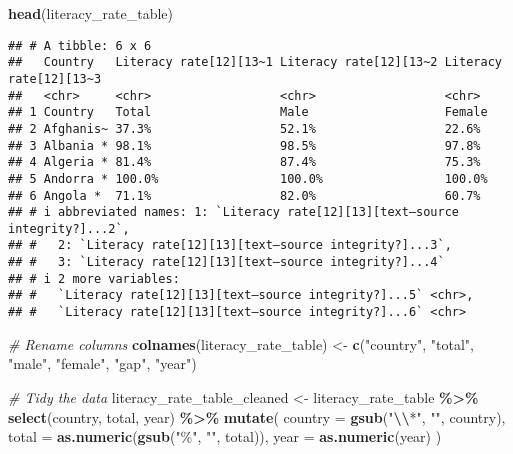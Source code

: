 \documentclass[
]{article}
\newenvironment{Shaded}{\begin{snugshade}}{\end{snugshade}}
\newcommand{\AttributeTok}[1]{\textcolor[rgb]{0.13,0.29,0.53}{#1}}
\newcommand{\CommentTok}[1]{\textcolor[rgb]{0.56,0.35,0.01}{\textit{#1}}}
\newcommand{\FunctionTok}[1]{\textcolor[rgb]{0.13,0.29,0.53}{\textbf{#1}}}
\newcommand{\NormalTok}[1]{#1}
\newcommand{\OtherTok}[1]{\textcolor[rgb]{0.56,0.35,0.01}{#1}}
\newcommand{\SpecialCharTok}[1]{\textcolor[rgb]{0.81,0.36,0.00}{\textbf{#1}}}
\newcommand{\StringTok}[1]{\textcolor[rgb]{0.31,0.60,0.02}{#1}}
\begin{document}
\begin{Shaded}
\begin{Highlighting}[]
\FunctionTok{head}\NormalTok{(literacy\_rate\_table)}
\end{Highlighting}
\end{Shaded}

\begin{verbatim}
## # A tibble: 6 x 6
##   Country   Literacy rate[12][13~1 Literacy rate[12][13~2 Literacy rate[12][13~3
##   <chr>     <chr>                  <chr>                  <chr>                 
## 1 Country   Total                  Male                   Female                
## 2 Afghanis~ 37.3%                  52.1%                  22.6%                 
## 3 Albania * 98.1%                  98.5%                  97.8%                 
## 4 Algeria * 81.4%                  87.4%                  75.3%                 
## 5 Andorra * 100.0%                 100.0%                 100.0%                
## 6 Angola *  71.1%                  82.0%                  60.7%                 
## # i abbreviated names: 1: `Literacy rate[12][13][text–source integrity?]...2`,
## #   2: `Literacy rate[12][13][text–source integrity?]...3`,
## #   3: `Literacy rate[12][13][text–source integrity?]...4`
## # i 2 more variables:
## #   `Literacy rate[12][13][text–source integrity?]...5` <chr>,
## #   `Literacy rate[12][13][text–source integrity?]...6` <chr>
\end{verbatim}

\begin{Shaded}
\begin{Highlighting}[]
\CommentTok{\# Rename columns}
\FunctionTok{colnames}\NormalTok{(literacy\_rate\_table) }\OtherTok{\textless{}{-}} \FunctionTok{c}\NormalTok{(}\StringTok{"country"}\NormalTok{, }\StringTok{"total"}\NormalTok{, }\StringTok{"male"}\NormalTok{, }\StringTok{"female"}\NormalTok{, }\StringTok{"gap"}\NormalTok{, }\StringTok{"year"}\NormalTok{)}

\CommentTok{\# Tidy the data}
\NormalTok{literacy\_rate\_table\_cleaned }\OtherTok{\textless{}{-}}\NormalTok{ literacy\_rate\_table }\SpecialCharTok{\%\textgreater{}\%}
  \FunctionTok{select}\NormalTok{(country, total, year) }\SpecialCharTok{\%\textgreater{}\%}
  \FunctionTok{mutate}\NormalTok{(}
    \AttributeTok{country =} \FunctionTok{gsub}\NormalTok{(}\StringTok{"}\SpecialCharTok{\textbackslash{}\textbackslash{}}\StringTok{*"}\NormalTok{, }\StringTok{""}\NormalTok{, country),  }
    \AttributeTok{total =} \FunctionTok{as.numeric}\NormalTok{(}\FunctionTok{gsub}\NormalTok{(}\StringTok{"\%"}\NormalTok{, }\StringTok{""}\NormalTok{, total)), }
    \AttributeTok{year =} \FunctionTok{as.numeric}\NormalTok{(year)                 }
\NormalTok{  )}
\end{Highlighting}
\end{Shaded}
\end{document}
